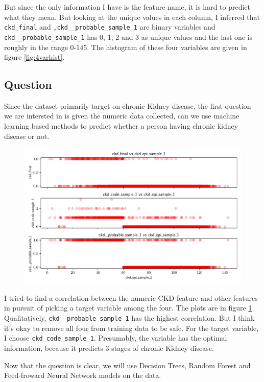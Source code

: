 \documentclass{article}
\begin{document}
But since the only information I have is the feature name, it is hard to predict what they mean.
But looking at the unique values in each column, I inferred that \texttt{ckd\_final} and 
\texttt{,ckd\_\_probable\_sample\_1} are binary variables and \texttt{ckd\_\_probable\_sample\_1} has 0, 1, 2
and 3 as unique values and the last one is roughly in the range 0-145. The histogram of these four variables 
are given in figure \ref{fig:4varhist}.

\subsection{Question}
Since the dataset primarily target on chronic Kidney disease, the first question we are intersted in is
given the numeric data collected, can we use machine learning based methods to predict whether a 
person having chronic kidney disease or not. 
\begin{figure}
    \centering
    \includegraphics[scale=.7]{targetvar_correlation.pdf}
    \label{fig:4varcorr}
    \caption{}
\end{figure}
I tried to find a correlation between the numeric CKD feature and other features in pursuit of picking 
a target variable among the four. The plots are in figure \ref{fig:4varcorr}. Qualitatively, \texttt{ckd\_\_probable\_sample\_1} has the highest correlation. But 
I think it's okay to remove all four from training data to be safe. For the target variable, I choose 
\texttt{ckd\_code\_sample\_1}. Presumably, the variable has the optimal information, because it predicts
3 stages of chronic Kidney disease.\par 
Now that the question is clear, we will use Decision Trees, Random Forest and Feed-froward Neural Network models 
on the data. 
\end{document}
